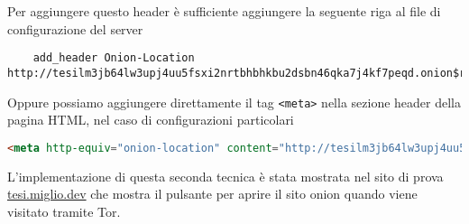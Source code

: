 Per aggiungere questo header è sufficiente aggiungere la seguente riga al file di configurazione del server
\begin{lstlisting}
    add_header Onion-Location http://tesilm3jb64lw3upj4uu5fsxi2nrtbhbhkbu2dsbn46qka7j4kf7peqd.onion$request_uri;
\end{lstlisting}
Oppure possiamo aggiungere direttamente il tag \lstinline{<meta>} nella sezione header della pagina HTML, nel caso di configurazioni particolari 
\begin{lstlisting}[language=HTML]
    <meta http-equiv="onion-location" content="http://tesilm3jb64lw3upj4uu5fsxi2nrtbhbhkbu2dsbn46qka7j4kf7peqd.onion" />
\end{lstlisting}
L'implementazione di questa seconda tecnica è stata mostrata nel sito di prova \url{tesi.miglio.dev} che mostra il pulsante per aprire il sito onion quando viene visitato tramite Tor. \\



